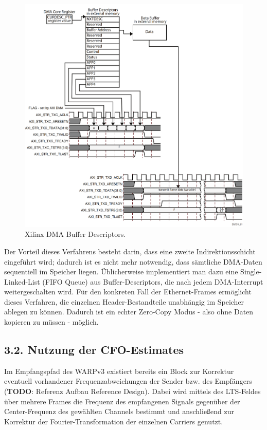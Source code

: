\documentclass[ngerman,]{scrartcl}
\begin{document}
\begin{figure}
\centering
\includegraphics{ds759_axi_ethernet_075.png}
\caption{Xilinx DMA Buffer Descriptors.\label{fig:dma}}
\end{figure}

Der Vorteil dieses Verfahrens besteht darin, dass eine zweite
Indirektionsschicht eingeführt wird; dadurch ist es nicht mehr
notwendig, dass sämtliche DMA-Daten sequentiell im Speicher liegen.
Üblicherweise implementiert man dazu eine Single-Linked-List (FIFO
Queue) aus Buffer-Descriptors, die nach jedem DMA-Interrupt
weitergeschalten wird. Für den konkreten Fall der Ethernet-Frames
ermöglicht dieses Verfahren, die einzelnen Header-Bestandteile
unabhängig im Speicher ablegen zu können. Dadurch ist ein echter
Zero-Copy Modus - also ohne Daten kopieren zu müssen - möglich.

\subsection{3.2. Nutzung der
CFO-Estimates}\label{nutzung-der-cfo-estimates}

Im Empfangspfad des WARPv3 existiert bereits ein Block zur Korrektur
eventuell vorhandener Frequenzabweichungen der Sender bzw. des
Empfängers (\textbf{TODO}: Referenz Aufbau Reference Design). Dabei wird
mittels des LTS-Feldes über mehrere Frames die Frequenz des empfangenen
Signals gegenüber der Center-Frequenz des gewählten Channels bestimmt
und anschließend zur Korrektur der Fourier-Transformation der einzelnen
Carriers genutzt.
\end{document}
